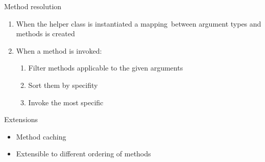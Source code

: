 \documentclass[14pt]{beamer}
\begin{document}
\begin{frame}{Method resolution}

  \begin{enumerate}
    \item When the helper class is instantiated a mapping\
      between argument types and methods is created
    \item When a method is invoked: {
      \begin{enumerate}
        \item Filter methods applicable to the given arguments 
        \item Sort them by specifity
        \item Invoke the most specific
      \end{enumerate}
    }
  \end{enumerate}
\end{frame}

\begin{frame}{Extensions}
  \begin{itemize}
    \item Method caching
    \item Extensible to different ordering of methods
  \end{itemize}
\end{frame}
\end{document}
